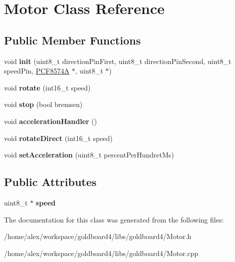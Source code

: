 \hypertarget{class_motor}{}\section{Motor Class Reference}
\label{class_motor}
\subsection*{Public Member Functions}
\begin{DoxyCompactItemize}
\item 
void {\bfseries init} (uint8\+\_\+t direction\+Pin\+First, uint8\+\_\+t direction\+Pin\+Second, uint8\+\_\+t speed\+Pin, \hyperlink{class_p_c_f8574_a}{P\+C\+F8574A} $\ast$, uint8\+\_\+t $\ast$)\hypertarget{class_motor_a9bfe106b0b35300d4c50bdb996a6d75c}{}\label{class_motor_a9bfe106b0b35300d4c50bdb996a6d75c}

\item 
void {\bfseries rotate} (int16\+\_\+t speed)\hypertarget{class_motor_aa5088f286e723e55cc38fe712e847c63}{}\label{class_motor_aa5088f286e723e55cc38fe712e847c63}

\item 
void {\bfseries stop} (bool bremsen)\hypertarget{class_motor_ab0b38acc90da22cbeb5f4b0234616e52}{}\label{class_motor_ab0b38acc90da22cbeb5f4b0234616e52}

\item 
void {\bfseries acceleration\+Handler} ()\hypertarget{class_motor_a71e53d91b88aa532c4ae8bccac3a85ad}{}\label{class_motor_a71e53d91b88aa532c4ae8bccac3a85ad}

\item 
void {\bfseries rotate\+Direct} (int16\+\_\+t speed)\hypertarget{class_motor_a8f9a423dd18e005b2e732324031730bb}{}\label{class_motor_a8f9a423dd18e005b2e732324031730bb}

\item 
void {\bfseries set\+Acceleration} (uint8\+\_\+t percent\+Per\+Hundret\+Ms)\hypertarget{class_motor_ae5d7052859ad6cff34184a6794af4222}{}\label{class_motor_ae5d7052859ad6cff34184a6794af4222}

\end{DoxyCompactItemize}
\subsection*{Public Attributes}
\begin{DoxyCompactItemize}
\item 
uint8\+\_\+t $\ast$ {\bfseries speed}\hypertarget{class_motor_a1dbc9bc30ae5271f34b31c8d0ea59d0b}{}\label{class_motor_a1dbc9bc30ae5271f34b31c8d0ea59d0b}

\end{DoxyCompactItemize}


The documentation for this class was generated from the following files\+:\begin{DoxyCompactItemize}
\item 
/home/alex/workspace/goldboard4/libs/goldboard4/Motor.\+h\item 
/home/alex/workspace/goldboard4/libs/goldboard4/Motor.\+cpp\end{DoxyCompactItemize}
